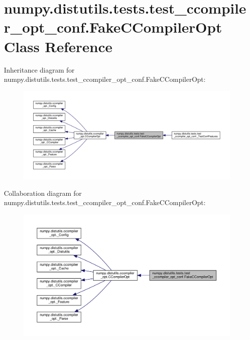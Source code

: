 \hypertarget{classnumpy_1_1distutils_1_1tests_1_1test__ccompiler__opt__conf_1_1FakeCCompilerOpt}{}\section{numpy.\+distutils.\+tests.\+test\+\_\+ccompiler\+\_\+opt\+\_\+conf.\+Fake\+C\+Compiler\+Opt Class Reference}
\label{classnumpy_1_1distutils_1_1tests_1_1test__ccompiler__opt__conf_1_1FakeCCompilerOpt}


Inheritance diagram for numpy.\+distutils.\+tests.\+test\+\_\+ccompiler\+\_\+opt\+\_\+conf.\+Fake\+C\+Compiler\+Opt\+:
\nopagebreak
\begin{figure}[H]
\begin{center}
\leavevmode
\includegraphics[width=350pt]{classnumpy_1_1distutils_1_1tests_1_1test__ccompiler__opt__conf_1_1FakeCCompilerOpt__inherit__graph}
\end{center}
\end{figure}


Collaboration diagram for numpy.\+distutils.\+tests.\+test\+\_\+ccompiler\+\_\+opt\+\_\+conf.\+Fake\+C\+Compiler\+Opt\+:
\nopagebreak
\begin{figure}[H]
\begin{center}
\leavevmode
\includegraphics[width=350pt]{classnumpy_1_1distutils_1_1tests_1_1test__ccompiler__opt__conf_1_1FakeCCompilerOpt__coll__graph}
\end{center}
\end{figure}
